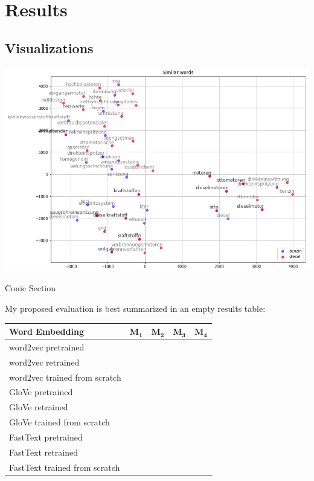\documentclass[10pt,a4paper]{article}
\begin{document}
	\section{Results}
	\subsection{Visualizations}
	    \begin{center}
		\includegraphics[scale=0.5]{./Pictures/test.png}
		\caption{Conic Section}
	\end{center}
	
	My proposed evaluation is best summarized in an empty results table:
	
	\begin{center}
		\begin{tabular}{|l| c| c| c|c|}
			\hline
			\textbf{Word Embedding} & $\boldsymbol{M_1}$ & $\boldsymbol{M_2}$ & $\boldsymbol{M_3}$ & $\boldsymbol{M_4}$\\ 
			\hline
			word2vec pretrained & \textbullet & \textbullet & \textbullet & \textbullet\\  \hline
			word2vec retrained & \textbullet & \textbullet & \textbullet & \textbullet\\  	\hline
			word2vec trained from scratch  & \textbullet & \textbullet & \textbullet & \textbullet\\  	\hline
			GloVe pretrained & \textbullet & \textbullet & \textbullet & \textbullet\\  
			\hline
			GloVe retrained & \textbullet & \textbullet & \textbullet & \textbullet\\
			\hline
			GloVe trained from scratch  & \textbullet & \textbullet & \textbullet & \textbullet\\  	
			\hline
			FastText pretrained & \textbullet & \textbullet & \textbullet & \textbullet\\  \hline
			FastText retrained & \textbullet & \textbullet & \textbullet & \textbullet\\  	\hline
			FastText trained from scratch  & \textbullet & \textbullet & \textbullet & \textbullet\\  	
			\hline
			
			
		\end{tabular}
	\end{center}
\end{document}
